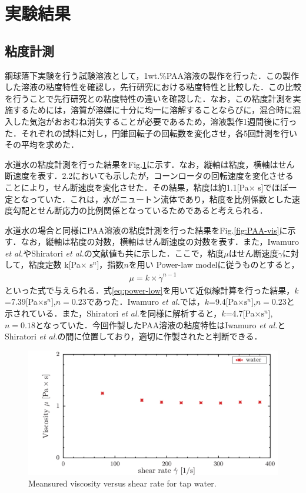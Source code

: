 \section{実験結果}
\subsection{粘度計測}
鋼球落下実験を行う試験溶液として，1wt.\%PAA溶液の製作を行った．この製作した溶液の粘度特性を確認し，先行研究\cite{ref:9}\cite{ref:10}における粘度特性と比較した．この比較を行うことで先行研究との粘度特性の違いを確認した．なお，この粘度計測を実施するためには，溶質が溶媒に十分に均一に溶解することならびに，混合時に混入した気泡がおおむね消失することが必要であるため，溶液製作1週間後に行った．それぞれの試料に対し，円錐回転子の回転数を変化させ，各5回計測を行いその平均を求めた．

水道水の粘度計測を行った結果をFig.\ref{fig:water-vis}に示す．なお，縦軸は粘度，横軸はせん断速度を表す．2.2においても示したが，コーンロータの回転速度を変化させることにより，せん断速度を変化させた．その結果，粘度は約1.1[Pa$\times$ s]でほぼ一定となっていた．これは，水がニュートン流体であり，粘度を比例係数とした速度勾配とせん断応力の比例関係となっているためであると考えられる．

水道水の場合と同様にPAA溶液の粘度計測を行った結果をFig.\ref{fig:PAA-vis}に示す．なお，縦軸は粘度の対数，横軸はせん断速度の対数を表す．また，Iwamuro {\it et al.}\cite{ref:9}やShiratori {\it et al.}\cite{ref:10}の文献値も共に示した．ここで，粘度$\mu$はせん断速度$\dot{\gamma}$に対して，粘度定数 k[Pa$\times$ $\text{s}^n$]，指数$n$を用い Power-law modelに従うものとすると，
\begin{eqnarray}
    \label{eq:power-low}
    \mu=k\times\dot{\gamma}^{n-1}
\end{eqnarray}
といった式で与えられる\cite{ref:1}．式\ref{eq:power-low}を用いて近似線計算を行った結果，$k$=7.39[Pa$\times \text{s}^n]$,$n=0.23$であった．Iwamuro {\it et al.}\cite{ref:9}では，$k$=9.4[Pa$\times \text{s}^n]$,$n=0.23$と示されている．また，Shiratori {\it et al.}\cite{ref:10}を同様に解析すると，$k$=4.7[Pa$\times \text{s}^n$],$n=0.18$となっていた．今回作製したPAA溶液の粘度特性はIwamuro {\it et al.}とShiratori {\it et al.}の間に位置しており，適切に作製されたと判断できる．

\begin{figure}[ht]
    \centering
    \includegraphics[width=12cm,clip]{4-Results/water.png}
    \caption{Meansured viscosity versus shear rate for tap water.}
    \label{fig:water-vis}
\end{figure}

